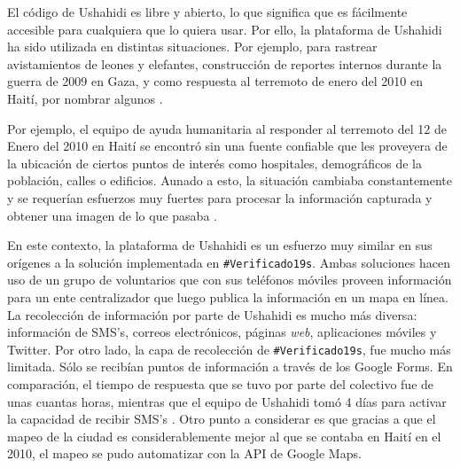 \documentclass[12pt,spanish,oneside,breaklinks]{book}
\begin{document}
El código de Ushahidi es libre y abierto, lo que significa que es fácilmente accesible para cualquiera que lo quiera usar. Por ello, la plataforma de Ushahidi ha sido utilizada en distintas situaciones. Por ejemplo, para rastrear avistamientos de leones y elefantes, construcción de reportes internos durante la guerra de 2009 en Gaza, y como respuesta al terremoto de enero del 2010 en Haití, por nombrar algunos \cite{guardianusha}.

Por ejemplo, el equipo de ayuda humanitaria al responder al terremoto del 12 de Enero del 2010 en Haití se encontró sin una fuente confiable que les proveyera de la ubicación de ciertos puntos de interés como hospitales, demográficos de la población, calles o  edificios. Aunado a esto, la situación cambiaba constantemente y se requerían esfuerzos muy fuertes para procesar la información capturada y obtener una imagen de lo que pasaba \cite{mora2011}.

En este contexto, la plataforma de Ushahidi es un esfuerzo muy similar en sus orígenes a la solución implementada en \texttt{\#Verificado19s}.  Ambas soluciones hacen uso de un grupo de voluntarios que con sus teléfonos móviles proveen información para un ente centralizador que luego publica la información en un mapa en línea. La recolección de información por parte de Ushahidi es mucho más diversa: información de SMS's, correos electrónicos, páginas \emph{web}, aplicaciones móviles y Twitter. Por otro lado, la capa de recolección de  \texttt{\#Verificado19s}, fue mucho más limitada. Sólo se recibían puntos de información a través de los Google Forms. En comparación, el tiempo de respuesta que se tuvo por parte del colectivo fue de unas cuantas horas, mientras que el equipo de Ushahidi tomó 4 días para activar la capacidad de recibir SMS's \cite{mora2011}. Otro punto a considerar es que gracias a que el mapeo de la ciudad es considerablemente mejor al que se contaba en Haití en el 2010, el mapeo se pudo automatizar con la API de Google Maps.
\end{document}
